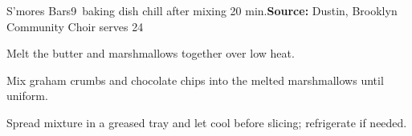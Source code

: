 \begin{recipe}{S'mores Bars}{9\inch{}\inch\ baking dish \hfill chill after mixing \hfill 20 min.}{\textbf{Source:} Dustin, Brooklyn Community Choir \hfill serves 24}

 Melt the butter and marshmallows together over low heat.

 Mix graham crumbs and chocolate chips into the melted marshmallows until uniform.

 \newstep Spread mixture in a greased tray and let cool before slicing; refrigerate if needed.
\end{recipe}
